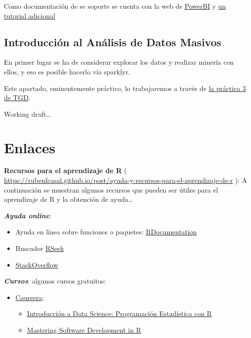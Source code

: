 \documentclass[
]{book}
\begin{document}
Como documentación de se soporte se cuenta con la web de \href{https://docs.microsoft.com/es-es/power-bi/}{PowerBI} y \href{https://ccance.net/manuales/powerbi/capitulo_01_introduccion.pdf}{un tutorial adicional}

\hypertarget{introducciuxf3n-al-anuxe1lisis-de-datos-masivos}{%
\section{Introducción al Análisis de Datos Masivos}\label{introducciuxf3n-al-anuxe1lisis-de-datos-masivos}}

En primer lugar se ha de considerar explorar los datos y realizar minería con ellos, y eso es posible hacerlo vía sparklyr.

Este apartado, eminentemente práctico, lo trabajaremos a través de \href{https://www.kaggle.com/gltaboada/t3-practice3-flights}{la práctica 3 de TGD}.

\hypertarget{appendix-apendices}{%
\appendix}


Working draft\ldots{}

\hypertarget{links}{%
\chapter{Enlaces}\label{links}}

\textbf{Recursos para el aprendizaje de R} ( \url{https://rubenfcasal.github.io/post/ayuda-y-recursos-para-el-aprendizaje-de-r}
): A continuación se muestran algunos recursos que pueden ser útiles para el aprendizaje de R y la obtención de ayuda\ldots{}

\textbf{\emph{Ayuda online}}:

\begin{itemize}
\item
  Ayuda en línea sobre funciones o paquetes: \href{https://www.rdocumentation.org/}{RDocumentation}
\item
  Buscador \href{http://rseek.org/}{RSeek}
\item
  \href{http://stackoverflow.com/questions/tagged/r}{StackOverflow}
\end{itemize}

\textbf{\emph{Cursos}}:
algunos cursos gratuitos:

\begin{itemize}
\item
  \href{https://www.coursera.org/}{Coursera}:

  \begin{itemize}
  \item
    \href{https://www.coursera.org/learn/intro-data-science-programacion-estadistica-r}{Introducción a Data Science: Programación Estadística con R}
  \item
    \href{https://www.coursera.org/specializations/r}{Mastering Software Development in R}
  \end{itemize}
\end{itemize}
\end{document}
